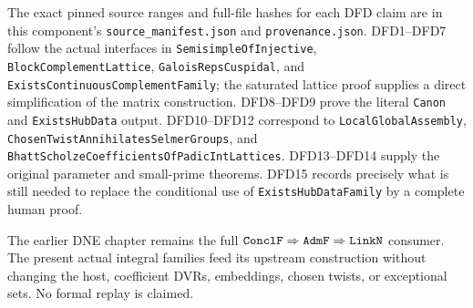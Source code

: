\documentclass[11pt,a4paper]{article}
\numberwithin{equation}{section}
\theoremstyle{remark}\newtheorem{remark}[theorem]{Remark}
\begin{document}
The exact pinned source ranges and full-file hashes for
each DFD claim are in this component's
\texttt{source\_\allowbreak manifest.\allowbreak json} and \texttt{provenance.\allowbreak json}.
DFD1--DFD7 follow the actual interfaces in
\texttt{Semisimple\allowbreak Of\allowbreak Injective},
\texttt{Block\allowbreak Complement\allowbreak Lattice},
\texttt{Galois\allowbreak Reps\allowbreak Cuspidal}, and
\texttt{Exists\allowbreak Continuous\allowbreak Complement\allowbreak Family}; the saturated
lattice proof supplies a direct simplification of the
matrix construction. DFD8--DFD9 prove the literal
\texttt{Canon} and \texttt{Exists\allowbreak Hub\allowbreak Data} output.
DFD10--DFD12 correspond to \texttt{Local\allowbreak Global\allowbreak Assembly},
\texttt{Chosen\allowbreak Twist\allowbreak Annihilates\allowbreak Selmer\allowbreak Groups}, and
\texttt{Bhatt\allowbreak Scholze\allowbreak Coefficients\allowbreak Of\allowbreak Padic\allowbreak Int\allowbreak Lattices}.
DFD13--DFD14 supply the original parameter and small-prime
theorems. DFD15 records precisely what is still needed
to replace the conditional use of
\texttt{Exists\allowbreak Hub\allowbreak Data\allowbreak Family} by a complete human proof.

The earlier DNE chapter remains the full
$\texttt{Concl\allowbreak F}\Rightarrow\texttt{Adm\allowbreak F}\Rightarrow
\texttt{Link\allowbreak N}$ consumer. The present actual integral
families feed its upstream construction without changing
the host, coefficient DVRs, embeddings, chosen twists,
or exceptional sets. No formal replay is claimed.

\endgroup
\end{document}
